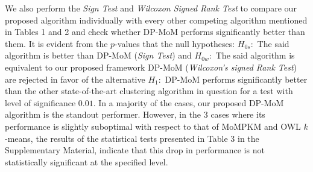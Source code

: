 \documentclass[12pt]{article}
\begin{document}
We also perform the \textit{Sign Test} and \textit{Wilcoxon Signed Rank Test} to compare our proposed algorithm individually with every other competing algorithm mentioned in Tables 1 and 2 and check whether DP-MoM performs significantly better than them. It is evident from the $p$-values that the null hypotheses: $H_{0s}:$ The said algorithm is better than DP-MoM (\textit{Sign Test}) and $H_{0w}:$ The said algorithm is equivalent to our proposed framework DP-MoM (\textit{Wilcoxon's signed Rank Test}) are rejected in favor of the alternative $H_1:$ DP-MoM performs significantly better than the other state-of-the-art clustering algorithm in question for a test with level of significance $0.01$. In a majority of the cases, our proposed DP-MoM algorithm is the standout performer. However, in the 3 cases where its performance is slightly suboptimal with respect to that of MoMPKM and OWL $k$-means, the results of the statistical tests presented in Table 3 in the Supplementary Material, indicate that this drop in performance is not statistically significant at the specified level.

\end{document}
